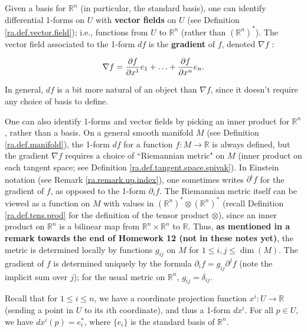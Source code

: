 \begin{remark}\label{ra.remark.riemannian.metric}

Given a basis for \(\mathbb{R}^n\) (in particular, the standard basis), one can identify differential 1-forms on \(U\) with \textbf{vector fields} on \(U\) (see Definition \ref{ra.def.vector.field}); i.e., functions from \(U\) to \(\mathbb{R}^n\) (rather than \((\mathbb{R}^n)^*\)). The vector field associated to the 1-form \(df\) is the \textbf{gradient} of \(f\), denoted \(\nabla f\) :

\[
\nabla f = \pderiv{f}{x^1} e_1 + \ldots + \pderiv{f}{x^n} e_n.
\]

In general, \(df\) is a bit more natural of an object than \(\nabla f\), since it doesn't require any choice of basis to define. 

One can also identify 1-forms and vector fields by picking an inner product for \(\mathbb{R}^n\), rather than a basis. On a general smooth manifold \(M\) (see Definition \ref{ra.def.manifold}), the 1-form \(df\) for a function \(f: M \to \mathbb{R}\) is always defined, but the gradient \(\nabla f\) requires a choice of ``Riemannian metric" on \(M\) (inner product on each tangent space; see Definition \ref{ra.def.tangent.space.spivak}). In Einstein notation (see Remark \ref{ra.remark.up.index}), one sometimes writes \(\partial^i f\) for the gradient of \(f\), as opposed to the 1-form \(\partial_i f\). The Riemannian metric itself can be viewed as a function on \(M\) with values in \((\mathbb{R}^n)^* \otimes (\mathbb{R}^n)^*\) (recall Definition \ref{ra.def.tens.prod} for the definition of the tensor product \(\otimes\)), since an inner product on \(\mathbb{R}^n\) is a bilinear map from \(\mathbb{R}^n \times \mathbb{R}^n\) to \(\mathbb{R}\). Thus, \textbf{as mentioned in a remark towards the end of Homework 12 (not in these notes yet)}, the metric is determined locally by functions \(g_{ij}\) on \(M\) for \(1 \leq i, j \leq \operatorname{dim}(M)\). The gradient of \(f\) is determined uniquely by the formula \(\partial_i f = g_{ij} \partial^j f\) (note the implicit sum over \(j\)); for the usual metric on \(\mathbb{R}^n\), \(g_{ij} = \delta_{ij} \).

\end{remark}

\begin{proposition}\label{ra.425b.hw13.prob.basis}

Recall that for \(1 \leq i \leq n\), we have a coordinate projection function \(x^i: U \to \mathbb{R}\) (sending a point in \(U\) to its \(i\)th coordinate), and thus a 1-form \(dx^i\). For all \(p \in U\), we have \(dx^i(p) = e_i^*\), where \(\{e_i\}\) is the standard basis of \(\mathbb{R}^n\).

\end{proposition}

